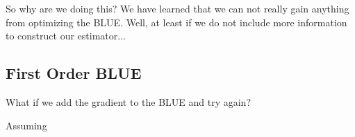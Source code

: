 So why are we doing this? We have learned that we can not really gain
anything from optimizing the BLUE. Well, at least if we do not include more
information to construct our estimator...

\subsection{First Order BLUE}

What if we add the gradient to the BLUE and try again? 

\begin{lemma}
	Assuming 	
\end{lemma}


